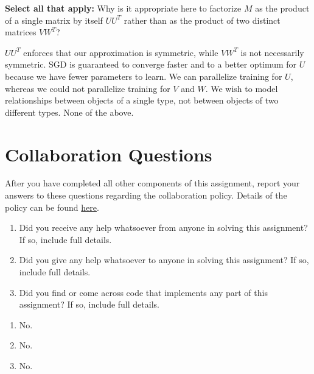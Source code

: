 \documentclass[11pt,addpoints,answers]{exam}
\newcommand{\sall}{\textbf{Select all that apply: }}
\begin{document}
\begin{questions}
\begin{parts}
\begin{subparts}
\subpart[2] \sall Why is it appropriate here to factorize $M$ as the product of a single matrix by itself $U U^T$ rather than as the product of two distinct matrices $VW^T$?
    {\checkboxchar{$\Box$} \checkedchar{$\blacksquare$}
    \begin{checkboxes}
    \CorrectChoice $U U^T$ enforces that our approximation is symmetric, while $VW^T$ is not necessarily symmetric.
    \choice SGD is guaranteed to converge faster and to a better optimum for $U$ because we have fewer parameters to learn.
    \choice We can parallelize training for $U$, whereas we could not parallelize training for $V$ and $W$.
    \CorrectChoice We wish to model relationships between objects of a single type, not between objects of two different types.
    \choice None of the above.
    \end{checkboxes}
    }
    

\end{subparts}

\end{parts}
    \newpage
\newpage
\section{Collaboration Questions}
After you have completed all other components of this assignment, report your answers to these questions regarding the collaboration policy. Details of the policy can be found \href{http://www.cs.cmu.edu/~mgormley/courses/10601/syllabus.html}{here}.
\begin{enumerate}
    \item Did you receive any help whatsoever from anyone in solving this assignment? If so, include full details.
    \item Did you give any help whatsoever to anyone in solving this assignment? If so, include full details.
    \item Did you find or come across code that implements any part of this assignment? If so, include full details.
\end{enumerate}

\begin{your_solution}[height=6cm]
\begin{enumerate}
	\item No.
	\item No.
	\item No.
\end{enumerate}
\end{your_solution}
    \newpage
    \end{questions}
\end{document}
